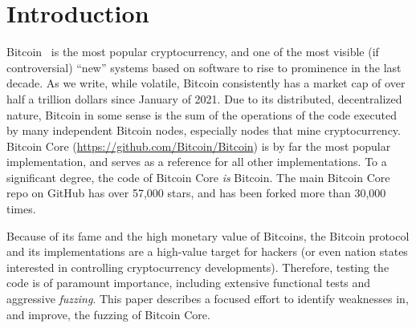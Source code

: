 \section{Introduction}

Bitcoin~\cite{nakamoto2008bitcoin} is the most popular cryptocurrency, and one of the most visible (if controversial) ``new'' systems based on software to rise to prominence in the last decade.  As we write, while volatile, Bitcoin consistently has a market cap of over half a trillion dollars since January of 2021.  Due to its distributed, decentralized nature, Bitcoin in some sense is the sum of the operations of the code executed by many independent Bitcoin nodes, especially nodes that mine cryptocurrency.  Bitcoin Core (\url{https://github.com/Bitcoin/Bitcoin}) is by far the most popular implementation, and serves as a reference for all other implementations.  To a significant degree, the code of Bitcoin Core \emph{is} Bitcoin.  The main Bitcoin Core repo on GitHub has over 57,000 stars, and has been forked more than 30,000 times.

Because of its fame and the high monetary value of Bitcoins, the Bitcoin protocol and its implementations are a high-value target for hackers (or even nation states interested in controlling cryptocurrency developments).  Therefore, testing the code is of paramount importance, including extensive functional tests and aggressive \emph{fuzzing}.  This paper describes a focused effort to identify weaknesses in, and improve, the fuzzing of Bitcoin Core.
